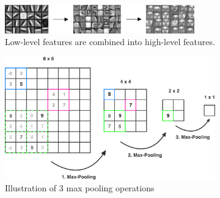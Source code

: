 \begin{figure}
    \begin{subfigure}{1\textwidth}
        \centering
        \includegraphics[width=0.9\textwidth]{resources/images/abstraction.png}
        \caption{Low-level features are combined into high-level features.}
        \label{fig:abstraction}
    \end{subfigure}
    \vspace{0.5cm}
    \begin{subfigure}{0.65\textwidth}
        \centering
        \includegraphics[width=\textwidth]{resources/images/max_pooling.png}
        \caption{Illustration of 3 max pooling operations}
        \label{fig:max_pooling}
    \end{subfigure}
    \begin{subfigure}{0.30\textwidth}
        \centering

\end{subfigure}
\end{figure}
